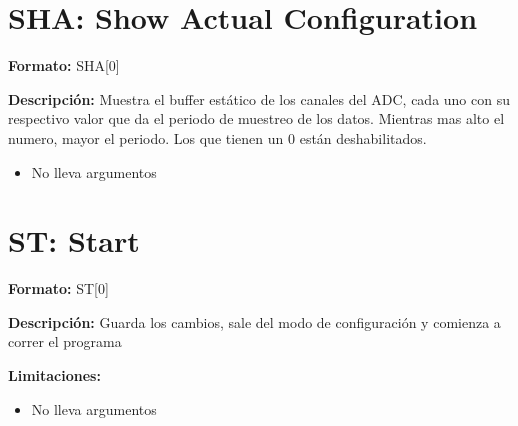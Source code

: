 \section{SHA: Show Actual Configuration} %
\label{sub:sha_show_actual_configuration}
\textbf{Formato:} SHA[0]

\textbf{Descripción:}
Muestra el buffer est\'atico de los canales del ADC, cada uno con su respectivo valor que da el periodo de muestreo de los datos. Mientras mas alto el numero, mayor el periodo. Los que tienen un 0 est\'an deshabilitados.

\begin{itemize}
  \item No lleva argumentos
\end{itemize}


\section{ST: Start} %
\label{sub:st_start}


\textbf{Formato:} ST[0]

\textbf{Descripción:}
Guarda los cambios, sale del modo de configuración y comienza a correr el programa

\textbf{Limitaciones:}
\begin{itemize}
  \item No lleva argumentos
\end{itemize}

